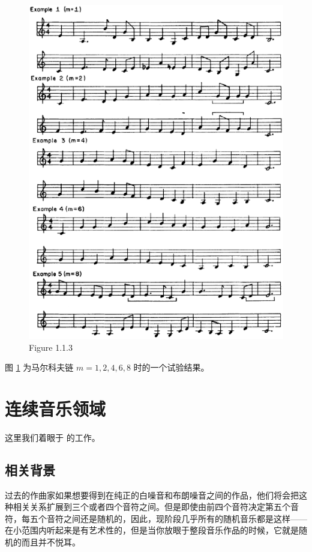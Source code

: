 \documentclass[11pt]{article}
\begin{document}
\begin{figure}[hptb]
	\centering
	\label{fig:1.1.3}
	\includegraphics[width=\textwidth]{pic/1.1.3.eps}
	\caption{Figure 1.1.3}
\end{figure}
图 \ref{fig:1.1.3} 为马尔科夫链 $m=1,2,4,6,8$ 时的一个试验结果。

\section{连续音乐领域}
这里我们着眼于 \cite{10.2307/24955701} 的工作。
\subsection{相关背景}
过去的作曲家如果想要得到在纯正的白噪音和布朗噪音之间的作品，他们将会把这种相关关系扩展到三个或者四个音符之间。但是即使由前四个音符决定第五个音符，每五个音符之间还是随机的，因此，现阶段几乎所有的随机音乐都是这样——在小范围内听起来是有艺术性的，但是当你放眼于整段音乐作品的时候，它就是随机的而且并不悦耳。
\end{document}
